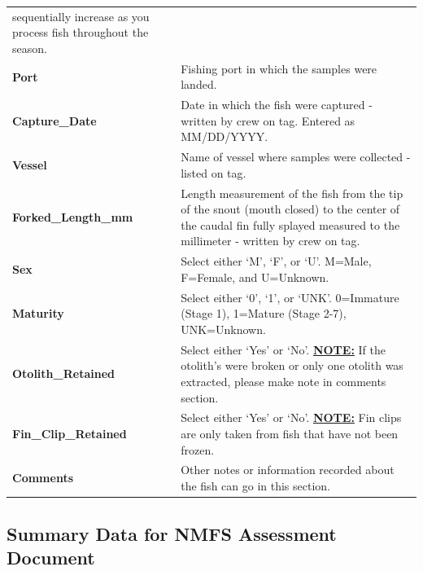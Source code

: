 \documentclass[
  letterpaper,
  DIV=11,
  numbers=noendperiod]{scrartcl}
\begin{document}
\begin{longtable}[]{@{}
  >{\raggedright\arraybackslash}p{}
  >{\raggedright\arraybackslash}p{}@{}}
sequentially increase as you process fish throughout the season. \\
\textbf{Port} & Fishing port in which the samples were landed. \\
\textbf{Capture\_Date} & Date in which the fish were captured - written
by crew on tag. Entered as MM/DD/YYYY. \\
\textbf{Vessel} & Name of vessel where samples were collected - listed
on tag. \\
\textbf{Forked\_Length\_mm} & Length measurement of the fish from the
tip of the snout (mouth closed) to the center of the caudal fin fully
splayed measured to the millimeter - written by crew on tag. \\
\textbf{Sex} & Select either `M', `F', or `U'. M=Male, F=Female, and
U=Unknown. \\
\textbf{Maturity} & Select either `0', `1', or `UNK'. 0=Immature (Stage
1), 1=Mature (Stage 2-7), UNK=Unknown. \\
\textbf{Otolith\_Retained} & Select either `Yes' or `No'.
\ul{\textbf{NOTE:}} If the otolith's were broken or only one otolith was
extracted, please make note in comments section. \\
\textbf{Fin\_Clip\_Retained} & Select either `Yes' or `No'.
\ul{\textbf{NOTE:}} Fin clips are only taken from fish that have not
been frozen. \\
\textbf{Comments} & Other notes or information recorded about the fish
can go in this section. \\
\end{longtable}

\hypertarget{summary-data-for-nmfs-assessment-document}{%
\subsection{Summary Data for NMFS Assessment
Document}\label{summary-data-for-nmfs-assessment-document}}
\end{document}
